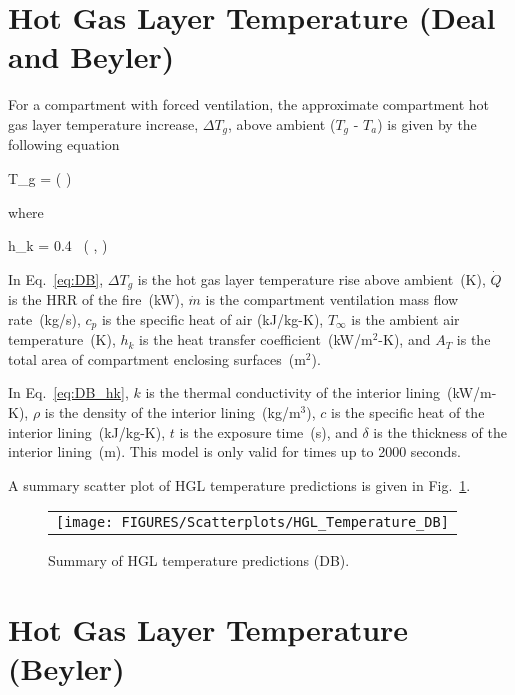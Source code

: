 \clearpage


\section{Hot Gas Layer Temperature (Deal and Beyler)}

For a compartment with forced ventilation, the approximate compartment hot gas layer temperature increase, $\Delta T_g$, above ambient ($T_g$ - $T_a$) is given by the following equation

\be
\Delta T_g = \left(  \right)
\label{eq:DB}
\ee

\noindent where

\be
h_k = 0.4\  \left(  ,  \right)
\label{eq:DB_hk}
\ee

In Eq.~\ref{eq:DB}, $\Delta T_g$ is the hot gas layer temperature rise above ambient~(K), $\dot Q$ is the HRR of the fire~(kW), $\dot m$ is the compartment ventilation mass flow rate~(kg/s), $c_p$ is the specific heat of air (kJ/kg-K), $T_\infty$ is the ambient air temperature~(K), $h_k$ is the heat transfer coefficient~(kW/m$^2$-K), and $A_T$ is the total area of compartment enclosing surfaces~(m$^2$).

In Eq.~\ref{eq:DB_hk}, $k$ is the thermal conductivity of the interior lining~(kW/m-K), $\rho$ is the density of the interior lining~(kg/m$^3$), $c$ is the specific heat of the interior lining~(kJ/kg-K), $t$ is the exposure time~(s), and $\delta$ is the thickness of the interior lining~(m). This model is only valid for times up to 2000 seconds.

\clearpage

A summary scatter plot of HGL temperature predictions is given in Fig.~\ref{hgl_temperature_DB_summary}.

\begin{figure}[ht]
\begin{center}
\begin{tabular}{l}
\texttt{[image: FIGURES/Scatterplots/HGL\_Temperature\_DB]}
\end{tabular}
\end{center}
\caption[Summary of HGL temperature predictions (DB).]
{Summary of HGL temperature predictions (DB).}
\label{hgl_temperature_DB_summary}
\end{figure}


\clearpage


\section{Hot Gas Layer Temperature (Beyler)}

